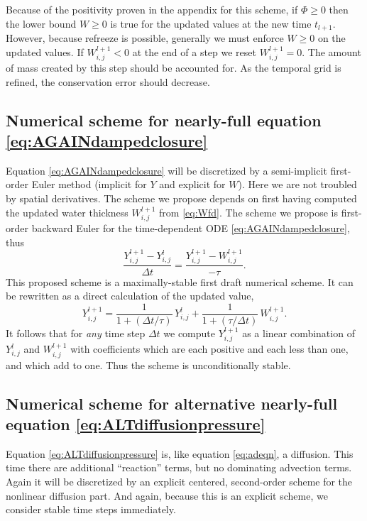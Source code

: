 \documentclass[12pt,final]{amsart}%
\begin{document}
Because of the positivity proven in the appendix for this scheme, if $\Phi\ge 0$ then the lower bound $W\ge 0$ is true for the updated values at the new time $t_{l+1}$.  However, because refreeze is possible, generally we must enforce $W\ge 0$ on the updated values.  If $W_{i,j}^{l+1}<0$ at the end of a step we reset $W_{i,j}^{l+1}=0$.  The amount of mass created by this step should be accounted for.  As the temporal grid is refined, the conservation error should decrease.


\subsection*{Numerical scheme for nearly-full equation \eqref{eq:AGAINdampedclosure}}    Equation \eqref{eq:AGAINdampedclosure} will be discretized by a semi-implicit first-order Euler method (implicit for $Y$ and explicit for $W$).  Here we are not troubled by spatial derivatives.  The scheme we propose depends on first having computed the updated water thickness $W_{i,j}^{l+1}$ from \eqref{eq:Wfd}.  The scheme we propose is first-order backward Euler \citep{BurdenFaires} for the time-dependent ODE \eqref{eq:AGAINdampedclosure}, thus
\begin{equation}
\frac{Y_{i,j}^{l+1} - Y_{i,j}^{l}}{\Delta t} = \frac{Y_{i,j}^{l+1} - W_{i,j}^{l+1}}{- \tau}. \label{eq:Yfd}
\end{equation}
This proposed scheme is a maximally-stable first draft numerical scheme.  It can be rewritten as a direct calculation of the updated value,
   $$Y_{i,j}^{l+1} = \frac{1}{1 + (\Delta t/\tau)}\, Y_{i,j}^{l} + \frac{1}{1 + (\tau / \Delta t)}\, W_{i,j}^{l+1}.$$
It follows that for \emph{any} time step $\Delta t$ we compute $Y_{i,j}^{l+1}$ as a linear combination of $Y_{i,j}^{l}$ and $W_{i,j}^{l+1}$ with coefficients which are each positive and each less than one, and which add to one.  Thus the scheme is unconditionally stable.


\subsection*{Numerical scheme for alternative nearly-full equation \eqref{eq:ALTdiffusionpressure}}   Equation \eqref{eq:ALTdiffusionpressure} is, like equation \eqref{eq:adeqn}, a diffusion.  This time there are additional ``reaction'' terms, but no dominating advection terms.  Again it will be discretized by an explicit centered, second-order scheme for the nonlinear diffusion part.  And again, because this is an explicit scheme, we consider stable time steps immediately.
\end{document}
